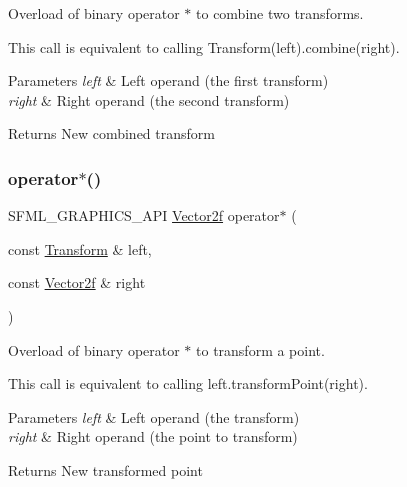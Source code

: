 Overload of binary operator $\ast$ to combine two transforms. 

This call is equivalent to calling Transform(left).combine(right).


\begin{DoxyParams}{Parameters}
{\em left} & Left operand (the first transform) \\
\hline
{\em right} & Right operand (the second transform)\\
\hline
\end{DoxyParams}
\begin{DoxyReturn}{Returns}
New combined transform \begin{DoxyVerb}\end{DoxyVerb}
 
\end{DoxyReturn}
\mbox{\label{classsf_1_1_transform_ac729169ec3036f3f3f3024c98efd041d}} 
\subsubsection{\texorpdfstring{operator$\ast$()}{operator*()}\hspace{0.1cm}{\footnotesize\ttfamily [2/2]}}
{\footnotesize\ttfamily S\+F\+M\+L\+\_\+\+G\+R\+A\+P\+H\+I\+C\+S\+\_\+\+A\+PI \mbox{\hyperlink{classsf_1_1_vector2}{Vector2f}} operator$\ast$ (\begin{DoxyParamCaption}\item[{const \mbox{\hyperlink{classsf_1_1_transform}{Transform}} \&}]{left,  }\item[{const \mbox{\hyperlink{classsf_1_1_vector2}{Vector2f}} \&}]{right }\end{DoxyParamCaption})\hspace{0.3cm}{\ttfamily [related]}}



Overload of binary operator $\ast$ to transform a point. 

This call is equivalent to calling left.\+transform\+Point(right).


\begin{DoxyParams}{Parameters}
{\em left} & Left operand (the transform) \\
\hline
{\em right} & Right operand (the point to transform)\\
\hline
\end{DoxyParams}
\begin{DoxyReturn}{Returns}
New transformed point \begin{DoxyVerb}\end{DoxyVerb}
 
\end{DoxyReturn}
\mbox{\label{classsf_1_1_transform_a45a9de70a463117f851f1264a6f558ba}} 
